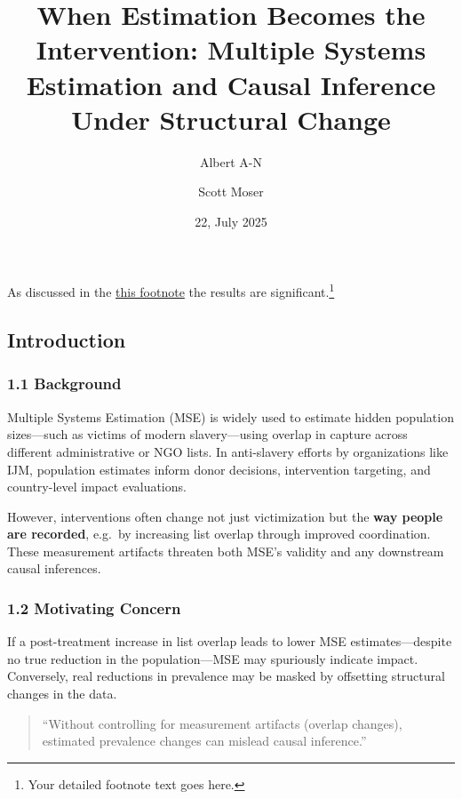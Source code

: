 \documentclass[
  12pt,
]{article}
\title{When Estimation Becomes the Intervention: Multiple Systems
Estimation and Causal Inference Under Structural Change}
\author{Albert A-N \and Scott Moser}
\date{22, July 2025}
\theoremstyle{plain}
\theoremstyle{definition}
\renewcommand*\contentsname{Table of contents}
\newcommand\contentsname{Table of contents}
\begin{document}
\maketitle

\renewcommand*\contentsname{Table of contents}
{
\hypersetup{linkcolor=}
\setcounter{tocdepth}{3}
\tableofcontents
}

As discussed in the \hyperref[footnote1]{this footnote} the results are
significant.\footnote{Your detailed footnote text goes here.}

\subsection{Introduction}\label{introduction}

\subsubsection{\texorpdfstring{\textbf{1.1
Background}}{1.1 Background}}\label{background}

Multiple Systems Estimation (MSE) is widely used to estimate hidden
population sizes---such as victims of modern slavery---using overlap in
capture across different administrative or NGO lists. In anti-slavery
efforts by organizations like IJM, population estimates inform donor
decisions, intervention targeting, and country-level impact evaluations.

However, interventions often change not just victimization but the
\textbf{way people are recorded}, e.g.~by increasing list overlap
through improved coordination. These measurement artifacts threaten both
MSE's validity and any downstream causal inferences.

\subsubsection{\texorpdfstring{\textbf{1.2 Motivating
Concern}}{1.2 Motivating Concern}}\label{motivating-concern}

If a post-treatment increase in list overlap leads to lower MSE
estimates---despite no true reduction in the population---MSE may
spuriously indicate impact. Conversely, real reductions in prevalence
may be masked by offsetting structural changes in the data.

\begin{quote}
``Without controlling for measurement artifacts (overlap changes),
estimated prevalence changes can mislead causal inference.''
\end{quote}
\end{document}

